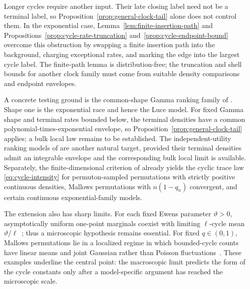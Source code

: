 \documentclass[11pt]{article}
\theoremstyle{remark}
\theoremstyle{plain}
\begin{document}
Longer cycles require another input.  Their late closing label need not be a
terminal label, so Proposition~\ref{prop:general-clock-tail} alone does not
control them.  In the exponential case, Lemma~\ref{lem:finite-insertion-path}
and Propositions~\ref{prop:cycle-rate-truncation}
and~\ref{prop:cycle-endpoint-bound} overcome this obstruction by swapping a
finite insertion path into the background, charging exceptional rates, and
marking the edge into the largest cycle label.  The finite-path lemma is
distribution-free; the truncation and shell bounds for another clock family
must come from suitable density comparisons and endpoint envelopes.

A concrete testing ground is the common-shape Gamma ranking family of
\cite{stern1990models}.  Shape one is the exponential race and hence the Luce
model.  For fixed Gamma shape and terminal rates bounded below, the terminal
densities have a common polynomial-times-exponential envelope, so
Proposition~\ref{prop:general-clock-tail} applies; a bulk local law remains to
be established.  The independent-utility ranking models of
\cite{thurstone1927law} are another natural target, provided their terminal
densities admit an integrable envelope and the corresponding bulk local limit
is available.  Separately, the finite-dimensional criterion of
\cite{mukherjee2016fixed} already yields the cyclic trace law
\eqref{eq:cycle-intensity} for permuton-sampled permutations with strictly
positive continuous densities, Mallows permutations with $n(1-q_n)$
convergent, and certain continuous exponential-family models.

The extension also has sharp limits.  For each fixed Ewens
parameter $\vartheta>0$, asymptotically uniform one-point marginals coexist
with limiting $\ell$-cycle mean $\vartheta/\ell$~\cite{tavare2021magical};
thus a microscopic hypothesis remains essential.  For fixed $q\in(0,1)$,
Mallows permutations lie in a localized regime in which bounded-cycle counts
have linear means and joint Gaussian rather than Poisson
fluctuations~\cite{he2023cycles}.  These examples underline the central
point: the macroscopic limit predicts the form of the cycle constants only
after a model-specific argument has reached the microscopic scale.


\small

\end{document}
